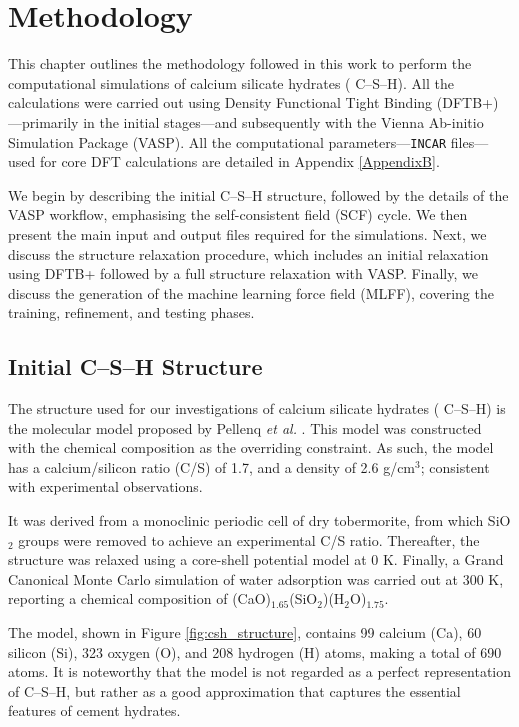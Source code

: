\chapter{Methodology}
\label{Chapter3}
This chapter outlines the methodology followed in this work to perform the computational simulations of calcium silicate hydrates ( C--S--H). All the calculations were carried out using Density Functional Tight Binding (DFTB+)---primarily in the initial stages---and subsequently with the Vienna Ab-initio Simulation Package (VASP). All the computational parameters---\texttt{INCAR} files---used for core DFT calculations are detailed in Appendix \ref{AppendixB}.

We begin by describing the initial  C--S--H structure, followed by the 
details of the VASP workflow, emphasising the self-consistent field (SCF) cycle. We then present the main input and output files required for the simulations. Next, we discuss the structure relaxation procedure, which includes an initial relaxation using DFTB+ followed by a full structure relaxation with VASP. Finally, we discuss the generation of the machine learning force field (MLFF), covering the training, refinement, and testing phases. 

\section{Initial  C--S--H Structure}
\label{sec:csh-structure}
The structure used for our investigations of calcium silicate hydrates ( C--S--H) is the molecular model proposed by Pellenq \emph{et al.} \cite{Pellenq2009}. This model was constructed with the chemical composition as the overriding constraint. As such, the model has a calcium/silicon ratio (C/S) of 1.7, and a density of 2.6 g/cm$^3$; consistent with experimental observations. 

It was derived from a monoclinic periodic cell of dry tobermorite, from which SiO$_2$ groups were removed to achieve an experimental C/S ratio. Thereafter, the structure was relaxed using a core-shell potential model at 0 K. Finally, a Grand Canonical Monte Carlo simulation of water adsorption was carried out at 300 K, reporting a chemical composition of (CaO)$_{1.65}$(SiO$_2$)(H$_2$O)$_{1.75}$. 

The model, shown in Figure \ref{fig:csh_structure}, contains
99 calcium (Ca), 60 silicon (Si), 323 oxygen (O), and 208 hydrogen (H) atoms, making a total of 690 atoms. It is noteworthy that the model is not regarded as a perfect representation of  C--S--H, but rather as a good approximation that captures the essential features of cement hydrates.

